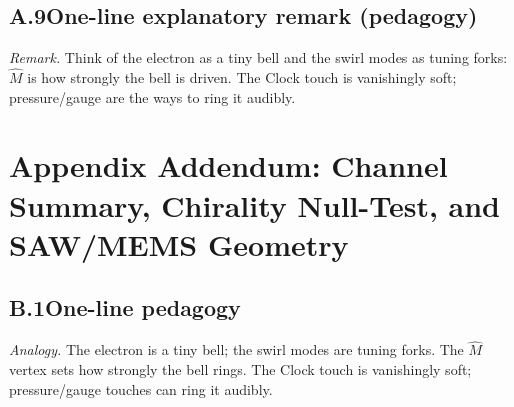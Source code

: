 \documentclass[aps,prb,preprint,amsmath,amssymb]{revtex4-2} %
\begin{document}
    \subsection*{A.9\quad One-line explanatory remark (pedagogy)}
    \emph{Remark.} Think of the electron as a tiny bell and the swirl modes as tuning forks: \(\hat M\) is how strongly the bell is driven. The Clock touch is vanishingly soft; pressure/gauge are the ways to ring it audibly.

    \section*{Appendix Addendum: Channel Summary, Chirality Null-Test, and SAW/MEMS Geometry}

    \subsection*{B.1\quad One-line pedagogy}
        \emph{Analogy.} The electron is a tiny bell; the swirl modes are tuning forks. The \(\hat M\) vertex sets how strongly the bell rings. The Clock touch is vanishingly soft; pressure/gauge touches can ring it audibly.
\end{document}

